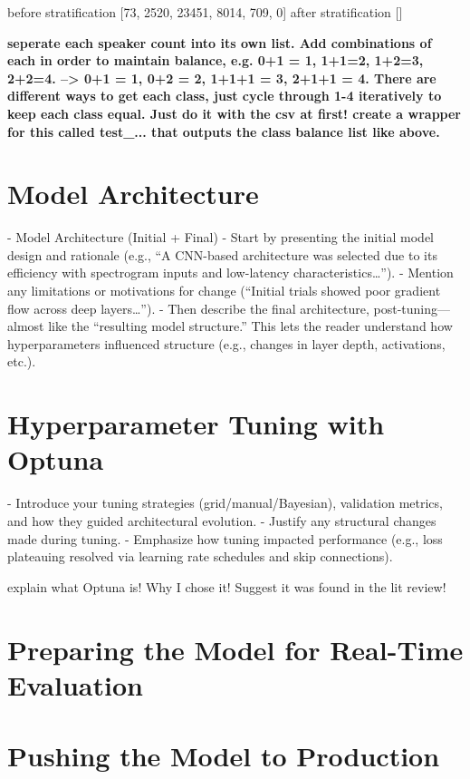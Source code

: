 before stratification [73, 2520, 23451, 8014, 709, 0]
after stratification []


\textbf{seperate each speaker count into its own list. Add combinations of each in order to maintain balance, e.g. 0+1 = 1, 1+1=2, 1+2=3, 2+2=4. --> 0+1 = 1, 0+2 = 2, 1+1+1 = 3, 2+1+1 = 4. There are different ways to get each class, just cycle through 1-4 iteratively to keep each class equal. Just do it with the csv at first! create a wrapper for this called test_... that outputs the class balance list like above.}

\section{Model Architecture}
- Model Architecture (Initial + Final)
- Start by presenting the initial model design and rationale (e.g., “A CNN-based architecture was selected due to its efficiency with spectrogram inputs and low-latency characteristics…”).
- Mention any limitations or motivations for change (“Initial trials showed poor gradient flow across deep layers…”).
- Then describe the final architecture, post-tuning—almost like the “resulting model structure.”
This lets the reader understand how hyperparameters influenced structure (e.g., changes in layer depth, activations, etc.).

\section{Hyperparameter Tuning with Optuna}
- Introduce your tuning strategies (grid/manual/Bayesian), validation metrics, and how they guided architectural evolution.
- Justify any structural changes made during tuning.
- Emphasize how tuning impacted performance (e.g., loss plateauing resolved via learning rate schedules and skip connections).

explain what Optuna is! Why I chose it! Suggest it was found in the lit review!
\section{Preparing the Model for Real-Time Evaluation}
\section{Pushing the Model to Production}